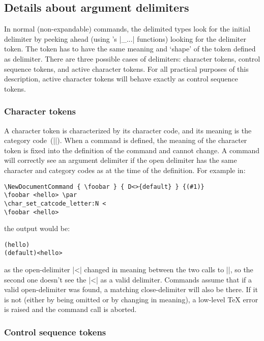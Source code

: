\documentclass{ltxguide}
\begin{document}
\subsection{Details about argument delimiters}

In normal (non-expandable) commands, the delimited types look for the
initial delimiter by peeking ahead (using 's |\peek_...|
functions) looking for the delimiter token.  The token has to have the
same meaning and `shape' of the token defined as delimiter.
There are three possible cases of delimiters: character tokens, control
sequence tokens, and active character tokens.  For all practical purposes
of this description, active character tokens will behave exactly as
control sequence tokens.

\subsubsection{Character tokens}

A character token is characterized by its character code, and its meaning
is the category code~(|\catcode|).  When a command is defined, the meaning
of the character token is fixed into the definition of the command and
cannot change.  A command will correctly see an argument delimiter if
the open delimiter has the same character and category codes as at the
time of the definition.  For example in:
\begin{verbatim}
\NewDocumentCommand { \foobar } { D<>{default} } {(#1)}
\foobar <hello> \par
\char_set_catcode_letter:N <
\foobar <hello>
\end{verbatim}
the output would be:
\begin{verbatim}
(hello)
(default)<hello>
\end{verbatim}
as the open-delimiter |<| changed in meaning between the two calls to
|\foobar|, so the second one doesn't see the |<| as a valid delimiter.
Commands assume that if a valid open-delimiter was found, a matching
close-delimiter will also be there.  If it is not (either by being
omitted or by changing in meaning), a low-level \TeX{} error is raised
and the command call is aborted.

\subsubsection{Control sequence tokens}
\end{document}
